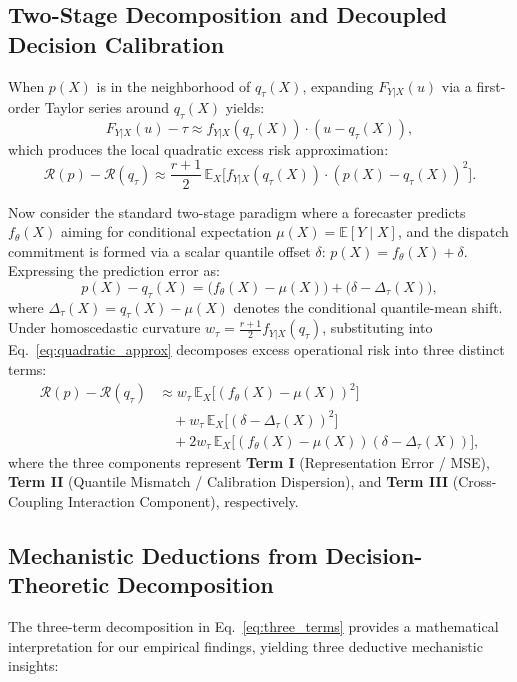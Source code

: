 \subsection{Two-Stage Decomposition and Decoupled Decision Calibration}
When $p(X)$ is in the neighborhood of $q_\tau(X)$, expanding $F_{Y|X}(u)$ via a first-order Taylor series around $q_\tau(X)$ yields:
\begin{equation}
F_{Y|X}(u) - \tau \approx f_{Y|X}(q_\tau(X)) \cdot (u - q_\tau(X)),
\end{equation}
which produces the local quadratic excess risk approximation:
\begin{equation}
\mathcal{R}(p) - \mathcal{R}(q_\tau) \approx \frac{r+1}{2} \, \mathbb{E}_X \big[ f_{Y|X}(q_\tau(X)) \cdot ( p(X) - q_\tau(X) )^2 \big].
\label{eq:quadratic_approx}
\end{equation}

Now consider the standard two-stage paradigm where a forecaster predicts $f_\theta(X)$ aiming for conditional expectation $\mu(X) = \mathbb{E}[Y \mid X]$, and the dispatch commitment is formed via a scalar quantile offset $\delta$: $p(X) = f_\theta(X) + \delta$. Expressing the prediction error as:
\begin{equation}
p(X) - q_\tau(X) = \big( f_\theta(X) - \mu(X) \big) + \big( \delta - \Delta_\tau(X) \big),
\end{equation}
where $\Delta_\tau(X) = q_\tau(X) - \mu(X)$ denotes the conditional quantile-mean shift. Under homoscedastic curvature $w_\tau = \frac{r+1}{2} f_{Y|X}(q_\tau)$, substituting into Eq.~\eqref{eq:quadratic_approx} decomposes excess operational risk into three distinct terms:
\begin{equation}
\begin{aligned}
\mathcal{R}(p) - \mathcal{R}(q_\tau) &\approx w_\tau \, \mathbb{E}_X \big[ (f_\theta(X) - \mu(X))^2 \big] \\
&\quad + w_\tau \, \mathbb{E}_X \big[ (\delta - \Delta_\tau(X))^2 \big] \\
&\quad + 2 w_\tau \, \mathbb{E}_X \big[ (f_\theta(X) - \mu(X))(\delta - \Delta_\tau(X)) \big],
\end{aligned}
\label{eq:three_terms}
\end{equation}
where the three components represent \textbf{Term I} (Representation Error / MSE), \textbf{Term II} (Quantile Mismatch / Calibration Dispersion), and \textbf{Term III} (Cross-Coupling Interaction Component), respectively.

\subsection{Mechanistic Deductions from Decision-Theoretic Decomposition}
The three-term decomposition in Eq.~\eqref{eq:three_terms} provides a mathematical interpretation for our empirical findings, yielding three deductive mechanistic insights:

